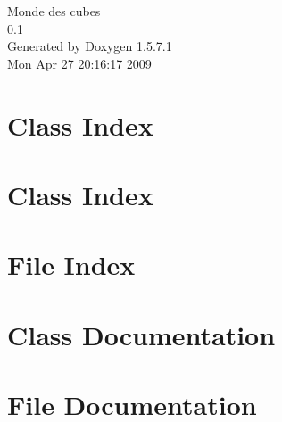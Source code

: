 \documentclass[a4paper]{book}
\begin{document}
\begin{titlepage}
\vspace*{7cm}
\begin{center}
{\Large Monde des cubes \\[1ex]\large 0.1 }\\
\vspace*{1cm}
{\large Generated by Doxygen 1.5.7.1}\\
\vspace*{0.5cm}
{\small Mon Apr 27 20:16:17 2009}\\
\end{center}
\end{titlepage}
\clearemptydoublepage
{}
\tableofcontents
\clearemptydoublepage
{}
\chapter{Class Index}

\chapter{Class Index}

\chapter{File Index}

\chapter{Class Documentation}












\chapter{File Documentation}













\printindex
\end{document}
